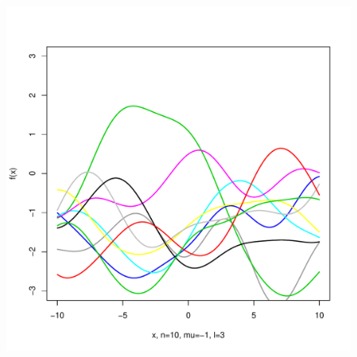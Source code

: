 \documentclass[12pt,letterpaper]{article}
\begin{document}
\begin{figure}
\begin{center}
\includegraphics[scale=0.2]{hw321/n10-m-1-l3.pdf}
\end{center}
\end{figure}
\end{document}
